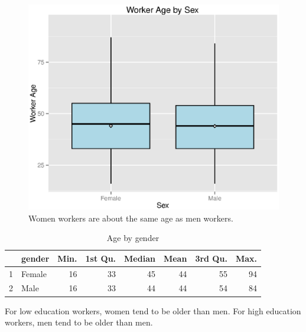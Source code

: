 \documentclass{exam}
\begin{document}
  \begin{figure}[H]
    \centering
    \includegraphics{figures/wa_age_by_sex.eps}
    \caption{Women workers are about the same age as men workers.}
  \end{figure}

  \begin{table}[ht]
    \centering
    \begin{tabular}{rlrrrrrr}
      \toprule
        & gender    & Min. & 1st Qu. & Median & Mean & 3rd Qu. & Max. \\
      \midrule
      1 & Female & 16   & 33      & 45     & 44   & 55      & 94 \\
      2 & Male   & 16   & 33      & 44     & 44   & 54      & 84 \\
      \bottomrule
    \end{tabular}
    \caption{Age by gender}
  \end{table}

  For low education workers, women tend to be older than men.  For high education workers, men
  tend to be older than men.  
\end{document}
